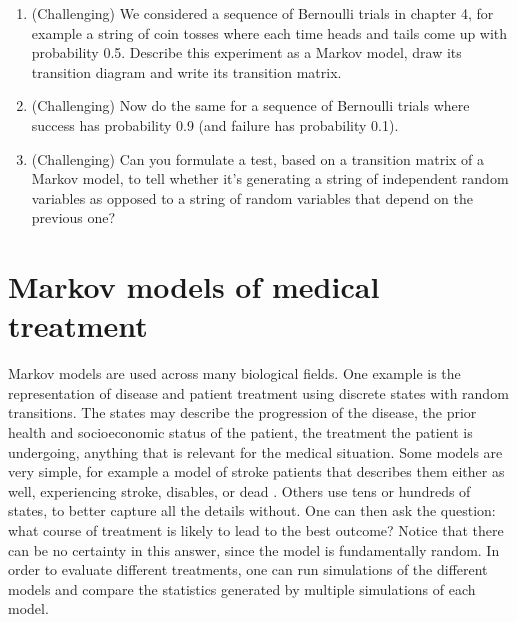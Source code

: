 \documentclass[
]{book}
\theoremstyle{definition}
\theoremstyle{definition}
\theoremstyle{definition}
\theoremstyle{remark}
\begin{document}
\begin{enumerate}
\item
  (Challenging) We considered a sequence of Bernoulli trials in chapter 4, for example a string of coin tosses where each time heads and tails come up with probability 0.5. Describe this experiment as a Markov model, draw its transition diagram and write its transition matrix.
\item
  (Challenging) Now do the same for a sequence of Bernoulli trials where success has probability 0.9 (and failure has probability 0.1).
\item
  (Challenging) Can you formulate a test, based on a transition matrix of a Markov model, to tell whether it's generating a string of independent random variables as opposed to a string of random variables that depend on the previous one?
\end{enumerate}

\hypertarget{markov-models-of-medical-treatment}{%
\section{Markov models of medical treatment}\label{markov-models-of-medical-treatment}}

\label{sec:bio10}

Markov models are used across many biological fields. One example is the representation of disease and patient treatment using discrete states with random transitions. The states may describe the progression of the disease, the prior health and socioeconomic status of the patient, the treatment the patient is undergoing, anything that is relevant for the medical situation. Some models are very simple, for example a model of stroke patients that describes them either as well, experiencing stroke, disables, or dead \citep{sonnenberg_markov_1993}. Others use tens or hundreds of states, to better capture all the details without. One can then ask the question: what course of treatment is likely to lead to the best outcome? Notice that there can be no certainty in this answer, since the model is fundamentally random. In order to evaluate different treatments, one can run simulations of the different models and compare the statistics generated by multiple simulations of each model.
\end{document}
